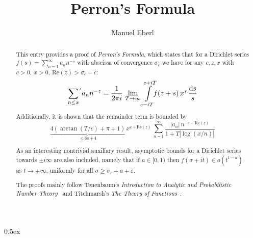\documentclass[11pt,a4paper]{article}
\begin{document}
\title{Perron's Formula}
\author{Manuel Eberl}
\maketitle

\begin{abstract}
This entry provides a proof of \emph{Perron's Formula}, which states that
for a Dirichlet series $f(s) = \sum_{n=1}^\infty a_n n^{-s}$ with abscissa of convergence $\sigma_c$
we have for any $c, z, x$ with $c > 0$, $x > 0$, $\text{Re}(z) > \sigma_c - c$:
  \[\sum\limits_{n\leq x}\kern-1pt^{'} a_n n^{-z} =
      \frac{1}{2\pi i}\, \lim_{T\to\infty} \int\limits_{c-iT}^{c+iT}\hskip-4pt f(z + s)\, x^s\,\frac{\text{d}s}{s} \]
Additionally, it is shown that the remainder term is bounded by
\[ \underbrace{4(\arctan (T/c) + \pi + 1)}_{\leq 6\pi+4}\,x^{c + \text{Re}(z)}\, 
     \sum_{n=1}^\infty \frac{|a_n|\,n^{-c - \text{Re}(z)}}{1 + T|\log (x/n)|} \]

As an interesting nontrivial auxiliary result, asymptotic bounds for a Dirichlet series towards
$\pm i\infty$ are also included, namely that if $a\in[0,1)$ then $f(\sigma + it) \in o(t^{1-a})$ as
$t\to\pm\infty$, uniformly for all $\sigma\geq \sigma_c + a + \varepsilon$.

The proofs mainly follow Tenenbaum's \emph{Introduction to Analytic and Probabilistic Number
Theory}~\cite{tenenbaum} and Titchmarsh's \emph{The Theory of Functions}~\cite{titchmarsh}.
\end{abstract}

\newpage
\tableofcontents

\newpage
\parindent 0pt\parskip 0.5ex



\nocite{titchmarsh, tenenbaum}
\raggedright


\end{document}
